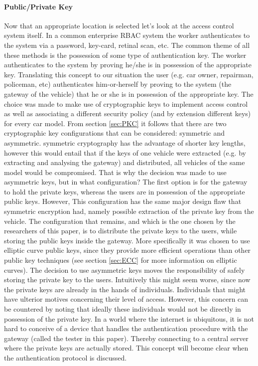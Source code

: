 \documentclass[11pt]{article}
\begin{document}
\paragraph{Public/Private Key} Now that an appropriate location is selected let's look at the access control system itself. In a common enterprise RBAC system the worker authenticates to the system via a password, key-card, retinal scan, etc. The common theme of all these methods is the possession of some type of authentication key. The worker authenticates to the system by proving he/she is in possession of the appropriate key. Translating this concept to our situation the user (e.g. car owner, repairman, policeman, etc) authenticates him-or-herself by proving to the system (the gateway of the vehicle) that he or she is in possession of the appropriate key. The choice was made to make use of cryptographic keys to implement access control as well as associating a different security policy (and by extension different keys) for every car model. From section \ref{sec:PKC} it follows that there are two cryptographic key configurations that can be considered: symmetric and asymmetric. symmetric cryptography has the advantage of shorter key lengths, however this would entail that if the keys of one vehicle were extracted (e.g. by extracting and analysing the gateway) and distributed, all vehicles of the same model would be compromised. That is why the decision was made to use asymmetric keys, but in what configuration? The first option is for the gateway to hold the private keys, whereas the users are in possession of the appropriate public keys. However, This configuration has the same major design flaw that symmetric encryption had, namely possible extraction of the private key from the vehicle. The configuration that remains, and which is the one chosen by the researchers of this paper, is to distribute the private keys to the users, while storing the public keys inside the gateway. More specifically it was chosen to use elliptic curve public keys, since they provide more efficient operations than other public key techniques (see section \ref{sec:ECC} for more information on elliptic curves). The decision to use asymmetric keys moves the responsibility of safely storing the private key to the users. Intuitively this might seem worse, since now the private keys are already in the hands of individuals. Individuals that might have ulterior motives concerning their level of access. However, this concern can be countered by noting that ideally these individuals would not be directly in possession of the private key. In a world where the internet is ubiquitous, it is not hard to conceive of a device that handles the authentication procedure with the gateway (called the tester in this paper). Thereby connecting to a central server where the private keys are actually stored. This concept will become clear when the authentication protocol is discussed.
\end{document}

